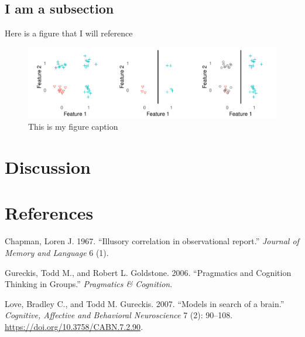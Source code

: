 \documentclass[
]{article}
\begin{document}
\hypertarget{i-am-a-subsection}{%
\subsection{I am a subsection}\label{i-am-a-subsection}}

Here is a figure that I will reference

\begin{figure}
\centering
\includegraphics{figures/learning_trap.pdf}
\caption{This is my figure caption\label{fig:learning_trap}}
\end{figure}

\hypertarget{discussion}{%
\section{Discussion}\label{discussion}}

\hypertarget{references}{%
\section*{References}\label{references}}

\hypertarget{refs}{}
\leavevmode\hypertarget{ref-Chapman1967}{}%
Chapman, Loren J. 1967. ``Illusory correlation in observational
report.'' \emph{Journal of Memory and Language} 6 (1).

\leavevmode\hypertarget{ref-Gureckis2006}{}%
Gureckis, Todd M., and Robert L. Goldstone. 2006. ``Pragmatics and
Cognition Thinking in Groups.'' \emph{Pragmatics \& Cognition}.

\leavevmode\hypertarget{ref-Love2007}{}%
Love, Bradley C., and Todd M. Gureckis. 2007. ``Models in search of a
brain.'' \emph{Cognitive, Affective and Behavioral Neuroscience} 7 (2):
90--108. \url{https://doi.org/10.3758/CABN.7.2.90}.
\end{document}
